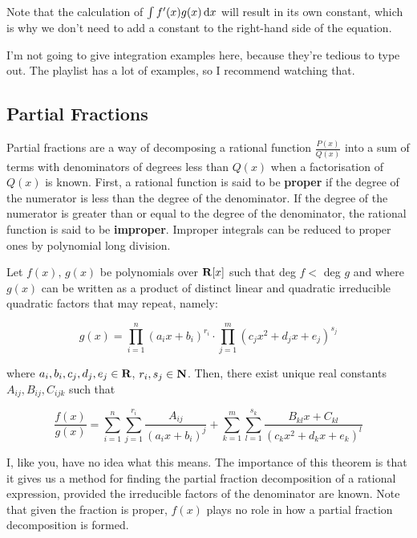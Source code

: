 \documentclass{article}
\begin{document}
  Note that the calculation of \(\int{f'(x)g(x) \, \mathrm{d}x}\) will result in its own constant, which is why we don't need to add a constant to the right-hand side of the equation.

  I'm not going to give integration examples here, because they're tedious to type out. The playlist has a lot of examples, so I recommend watching that.

  \subsection{Partial Fractions}

  Partial fractions are a way of decomposing a rational function \(\frac{P(x)}{Q(x)}\) into a sum of terms with denominators of degrees less than \(Q(x)\) when a factorisation of \(Q(x)\) is known. First, a rational function is said to be \textbf{proper} if the degree of the numerator is less than the degree of the denominator. If the degree of the numerator is greater than or equal to the degree of the denominator, the rational function is said to be \textbf{improper}. Improper integrals can be reduced to proper ones by polynomial long division.

  \begin{thm} Let \(f(x), \, g(x)\) be polynomials over \(\mathbf{R} [x]\) such that deg \(f <\) deg \(g\) and where \(g(x)\) can be written as a product of distinct linear and quadratic irreducible quadratic factors that may repeat, namely:

    \[
      g(x) = \prod_{i=1}^{n}{(a_i x + b_i)^{r_i}} \cdot \prod_{j=1}^{m}{(c_j x^2 + d_j x + e_j)^{s_j}}
    \]

    where \(a_i, b_i, c_j, d_j, e_j \in \mathbf{R}\), \(r_i, s_j \in \mathbf{N}\). Then, there exist unique real constants \(A_{ij}, B_{ij}, C_{ijk}\) such that

    \[
      \frac{f(x)}{g(x)} = \sum_{i=1}^{n}{\sum_{j=1}^{r_i}{\frac{A_{ij}}{(a_i x + b_i)^j}}} + \sum_{k=1}^{m}{\sum_{l=1}^{s_k}{\frac{B_{kl}x + C_{kl}}{(c_k x^2 + d_k x + e_k)^l}}}
    \]
  \end{thm}

  I, like you, have no idea what this means. The importance of this theorem is that it gives us a method for finding the partial fraction decomposition of a rational expression, provided the irreducible factors of the denominator are known. Note that given the fraction is proper, \(f(x)\) plays no role in how a partial fraction decomposition is formed. 
\end{document}
